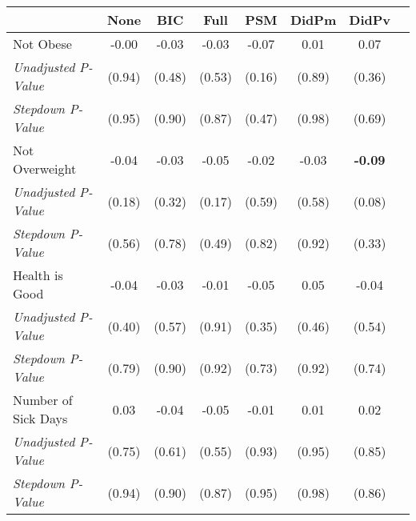 \begin{tabular}{l c c c c c c c}
\toprule
 & None & BIC & Full & PSM & DidPm & DidPv \\
\midrule
Not Obese & -0.00 & -0.03 & -0.03 & -0.07 & 0.01 & 0.07 \\
\quad \textit{Unadjusted P-Value} & (0.94) & (0.48) & (0.53) & (0.16) & (0.89) & (0.36) \\
\quad \textit{Stepdown P-Value} & (0.95) & (0.90) & (0.87) & (0.47) & (0.98) & (0.69) \\
Not Overweight & -0.04 & -0.03 & -0.05 & -0.02 & -0.03 & \textbf{ -0.09 } \\
\quad \textit{Unadjusted P-Value} & (0.18) & (0.32) & (0.17) & (0.59) & (0.58) & (0.08) \\
\quad \textit{Stepdown P-Value} & (0.56) & (0.78) & (0.49) & (0.82) & (0.92) & (0.33) \\
Health is Good & -0.04 & -0.03 & -0.01 & -0.05 & 0.05 & -0.04 \\
\quad \textit{Unadjusted P-Value} & (0.40) & (0.57) & (0.91) & (0.35) & (0.46) & (0.54) \\
\quad \textit{Stepdown P-Value} & (0.79) & (0.90) & (0.92) & (0.73) & (0.92) & (0.74) \\
Number of Sick Days & 0.03 & -0.04 & -0.05 & -0.01 & 0.01 & 0.02 \\
\quad \textit{Unadjusted P-Value} & (0.75) & (0.61) & (0.55) & (0.93) & (0.95) & (0.85) \\
\quad \textit{Stepdown P-Value} & (0.94) & (0.90) & (0.87) & (0.95) & (0.98) & (0.86) \\
\bottomrule
\end{tabular}
